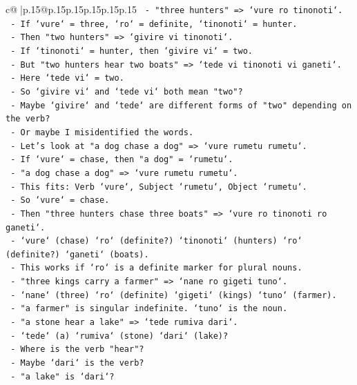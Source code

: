 \documentclass{article}
\begin{document}
{\begin{supertabular}{c@{$\;$}|p{.15\linewidth}@{}p{.15\linewidth}p{.15\linewidth}p{.15\linewidth}p{.15\linewidth}p{.15\linewidth}}
{{{\texttt{  {-} "three hunters" => `vure ro tinonoti`.} \\
\texttt{  {-} If `vure` = three, `ro` = definite, `tinonoti` = hunter.} \\
\texttt{  {-} Then "two hunters" => `givire vi tinonoti`.} \\
\texttt{  {-} If `tinonoti` = hunter, then `givire vi` = two.} \\
\texttt{  {-} But "two hunters hear two boats" => `tede vi tinonoti vi ganeti`.} \\
\texttt{  {-} Here `tede vi` = two.} \\
\texttt{  {-} So `givire vi` and `tede vi` both mean "two"?} \\
\texttt{  {-} Maybe `givire` and `tede` are different forms of "two" depending on the verb?} \\
\texttt{  {-} Or maybe I misidentified the words.} \\
\texttt{  {-} Let's look at "a dog chase a dog" => `vure rumetu rumetu`.} \\
\texttt{  {-} If `vure` = chase, then "a dog" = `rumetu`.} \\
\texttt{  {-} "a dog chase a dog" => `vure rumetu rumetu`.} \\
\texttt{  {-} This fits: Verb `vure`, Subject `rumetu`, Object `rumetu`.} \\
\texttt{  {-} So `vure` = chase.} \\
\texttt{  {-} Then "three hunters chase three boats" => `vure ro tinonoti ro ganeti`.} \\
\texttt{  {-} `vure` (chase) `ro` (definite?) `tinonoti` (hunters) `ro` (definite?) `ganeti` (boats).} \\
\texttt{  {-} This works if `ro` is a definite marker for plural nouns.} \\
\texttt{  {-} "three kings carry a farmer" => `nane ro gigeti tuno`.} \\
\texttt{  {-} `nane` (three) `ro` (definite) `gigeti` (kings) `tuno` (farmer).} \\
\texttt{  {-} "a farmer" is singular indefinite. `tuno` is the noun.} \\
\texttt{  {-} "a stone hear a lake" => `tede rumiva dari`.} \\
\texttt{  {-} `tede` (a) `rumiva` (stone) `dari` (lake)?} \\
\texttt{  {-} Where is the verb "hear"?} \\
\texttt{  {-} Maybe `dari` is the verb?} \\
\texttt{  {-} "a lake" is `dari`?} \\
}}}
\end{supertabular}}
\end{document}
